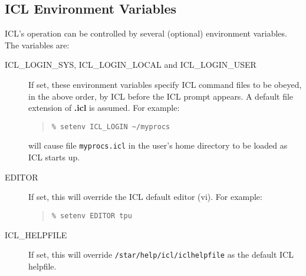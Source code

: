 \subsection{ICL Environment Variables}
\label{iclvars}
ICL's operation can be controlled by several (optional) environment
variables. The variables are:
\begin{description}
\item[ICL\_LOGIN\_SYS, ICL\_LOGIN\_LOCAL and ICL\_LOGIN\_USER]
If set, these environment variables specify ICL command files to be obeyed, 
in the above order, by ICL before the ICL prompt appears.
A default file extension of {\bf .icl} is assumed. For example:
\begin{quote} \begin{verbatim}
% setenv ICL_LOGIN ~/myprocs
\end{verbatim} \end{quote}
will cause file \verb!myprocs.icl! in the user's home directory to be loaded
as ICL starts up.
\item[EDITOR] If set, this will override the ICL default editor (vi). 
For example:
\begin{quote} \begin{verbatim}
% setenv EDITOR tpu
\end{verbatim} \end{quote}
\item[ICL\_HELPFILE] If set, this will override 
\verb!/star/help/icl/iclhelpfile! as the default ICL helpfile.
\end{description}


